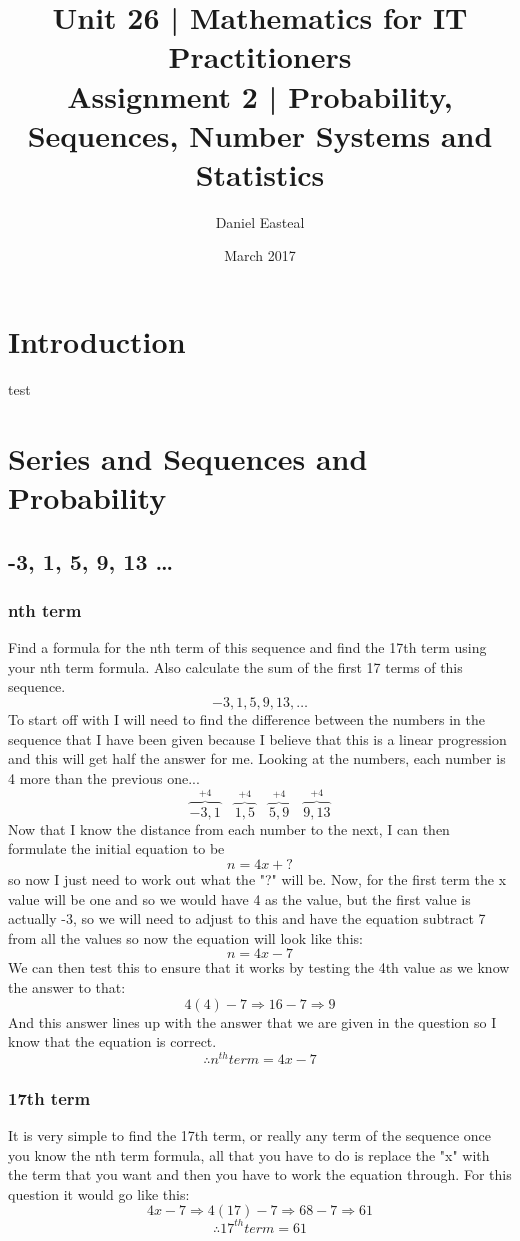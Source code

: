 \documentclass{article}
\begin{document}
\title{Unit 26 | Mathematics for IT Practitioners \\ \vspace{1.5cm} Assignment 2 | Probability, Sequences, Number Systems and Statistics}
\author{Daniel Easteal}
\date{March 2017}
\maketitle
\newpage
\tableofcontents
\newpage
\section{Introduction}
test
\section{Series and Sequences and Probability}
\subsection{-3, 1, 5, 9, 13 \dots}
\subsubsection{nth term}
Find a formula for the nth term of this sequence and find the 17th term using your nth term formula. Also calculate the sum of the first 17 terms of this sequence.
\[
	-3, 1, 5, 9, 13, \dots
\]
To start off with I will need to find the difference between the numbers in the sequence that I have been given because I believe that this is a linear progression and this will get half the answer for me. Looking at the numbers, each number is 4 more than the previous one...
\[
	\overbrace{-3, 1}^{+4}	\quad	\overbrace{1, 5}^{+4}	\quad	\overbrace{5, 9}^{+4}	\quad	\overbrace{9, 13}^{+4}
\]
Now that I know the distance from each number to the next, I can then formulate the initial equation to be $$ n=4x+?$$ so now I just need to work out what the "?" will be. Now, for the first term the x value will be one and so we would have 4 as the value, but the first value is actually -3, so we will need to adjust to this and have the equation subtract 7 from all the values so now the equation will look like this:
\[
	n=4x-7
\]
We can then test this to ensure that it works by testing the 4th value as we know the answer to that:
\[
	4(4)-7	\Rightarrow 16-7	\Rightarrow 9
\]
And this answer lines up with the answer that we are given in the question so I know that the equation is correct.  
\[
	\therefore n^{th} term = 4x-7
\]
\subsubsection{17th term}
It is very simple to find the 17th term, or really any term of the sequence once you know the nth term formula, all that you have to do is replace the "x" with the term that you want and then you have to work the equation through. For this question it would go like this: 
\[
	4x-7 \Rightarrow 4(17)-7 \Rightarrow 68-7 \Rightarrow 61
\]
\[
	\therefore 17^{th} term = 61
\]
\end{document}
